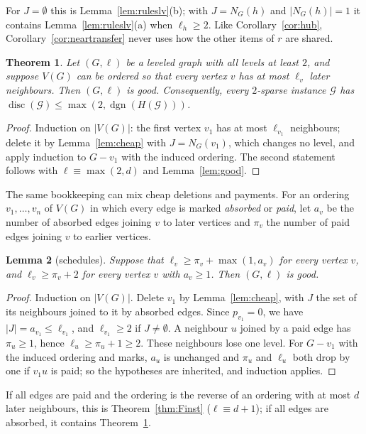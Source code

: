 \documentclass[11pt,letterpaper]{article}
\newtheorem{theorem}{Theorem}[section]
\newtheorem{lemma}[theorem]{Lemma}
\theoremstyle{definition}
\newcommand{\cG}{\mathcal{G}}
\DeclareMathOperator{\disc}{disc}
\begin{document}
For $J=\emptyset$ this is Lemma~\ref{lem:ruleslv}(b); with $J=N_G(h)$ and $|N_G(h)|=1$ it contains
Lemma~\ref{lem:ruleslv}(a) when $\ell_h\ge2$. Like Corollary~\ref{cor:hub}, Corollary~\ref{cor:neartransfer}
never uses how the other items of $r$ are shared.

\begin{theorem}\label{thm:maxtwod}
Let $(G,\ell)$ be a leveled graph with all levels at least $2$, and suppose $V(G)$ can be ordered so
that every vertex $v$ has at most $\ell_v$ later neighbours. Then $(G,\ell)$ is good. Consequently, every
$2$-sparse instance $\cG$ has $\disc(\cG)\le\max(2,\operatorname{dgn}(H(\cG)))$.
\end{theorem}

\begin{proof}
Induction on $|V(G)|$: the first vertex $v_1$ has at most $\ell_{v_1}$ neighbours; delete it by
Lemma~\ref{lem:cheap} with $J=N_G(v_1)$, which changes no level, and apply induction to $G-v_1$ with the
induced ordering. The second statement follows with $\ell\equiv\max(2,d)$ and Lemma~\ref{lem:good}.
\end{proof}

The same bookkeeping can mix cheap deletions and payments. For an ordering $v_1,\dots,v_n$ of $V(G)$ in
which every edge is marked \emph{absorbed} or \emph{paid}, let $a_v$ be the number of absorbed edges
joining $v$ to later vertices and $\pi_v$ the number of paid edges joining $v$ to earlier vertices.

\begin{lemma}[schedules]\label{lem:schedule}
Suppose that $\ell_v\ge \pi_v+\max(1,a_v)$ for every vertex $v$, and $\ell_v\ge \pi_v+2$ for every vertex $v$
with $a_v\ge1$. Then $(G,\ell)$ is good.
\end{lemma}

\begin{proof}
Induction on $|V(G)|$. Delete $v_1$ by Lemma~\ref{lem:cheap}, with $J$ the set of its neighbours joined
to it by absorbed edges. Since $p_{v_1}=0$, we have $|J|=a_{v_1}\le\ell_{v_1}$, and $\ell_{v_1}\ge2$ if
$J\ne\emptyset$. A neighbour $u$ joined by a paid edge has $\pi_u\ge1$, hence $\ell_u\ge \pi_u+1\ge2$. These
neighbours lose one level. For $G-v_1$ with the induced ordering and marks, $a_u$ is unchanged and $\pi_u$
and $\ell_u$ both drop by one if $v_1u$ is paid; so the hypotheses are inherited, and induction applies.
\end{proof}

If all edges are paid and the ordering is the reverse of an ordering with at most $d$ later neighbours,
this is Theorem~\ref{thm:Finst} ($\ell\equiv d+1$); if all edges are absorbed, it contains
Theorem~\ref{thm:maxtwod}.
\end{document}
